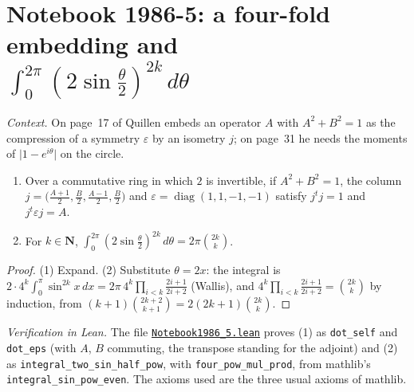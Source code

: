 \section[Notebook 1986-5: a four-fold embedding and a circle integral]{Notebook 1986-5: a four-fold embedding and\\ $\int_0^{2\pi}(2\sin\frac\theta2)^{2k}\,d\theta$\protect{}}\label{sec:quillen-1986-5}

\emph{Context.} On page~17 of  Quillen embeds an operator $A$ with $A^2 + B^2 = 1$ as the compression of a symmetry $\varepsilon$ by an isometry $j$; on page~31 he needs the moments of $\lvert 1 - e^{i\theta}\rvert$ on the circle.

\begin{encadre}
\begin{theoreme}\label{thm:quillen-1986-5}\leavevmode
\begin{enumerate}
\item Over a commutative ring in which $2$ is invertible, if $A^2 + B^2 = 1$, the column $j = \bigl(\frac{A+1}2, \frac B2, \frac{A-1}2, \frac B2\bigr)$ and $\varepsilon = \operatorname{diag}(1, 1, -1, -1)$ satisfy $j^tj = 1$ and $j^t\varepsilon j = A$.
\item For $k \in \mathbf N$, $\int_0^{2\pi} (2\sin\frac\theta2)^{2k}\,d\theta = 2\pi\binom{2k}k$.
\end{enumerate}
\end{theoreme}
\end{encadre}

\begin{proof}
(1) Expand. (2) Substitute $\theta = 2x$: the integral is $2\cdot 4^k\int_0^\pi \sin^{2k}x\,dx = 2\pi\, 4^k\prod_{i<k}\frac{2i+1}{2i+2}$ (Wallis), and $4^k\prod_{i<k}\frac{2i+1}{2i+2} = \binom{2k}k$ by induction, from $(k+1)\binom{2k+2}{k+1} = 2(2k+1)\binom{2k}k$.
\end{proof}

\emph{Verification in Lean.} The file \href{\leanblobmain/Notebook1986_5.lean}{\texttt{Notebook1986\_5.\allowbreak{}lean}} proves (1) as \texttt{dot\_self} and \texttt{dot\_eps} (with $A$, $B$ commuting, the transpose standing for the adjoint) and (2) as \texttt{integral\_two\_sin\_half\_pow}, with \texttt{four\_pow\_mul\_prod}, from mathlib's \texttt{integral\_sin\_pow\_even}. The axioms used are the three usual axioms of mathlib.

